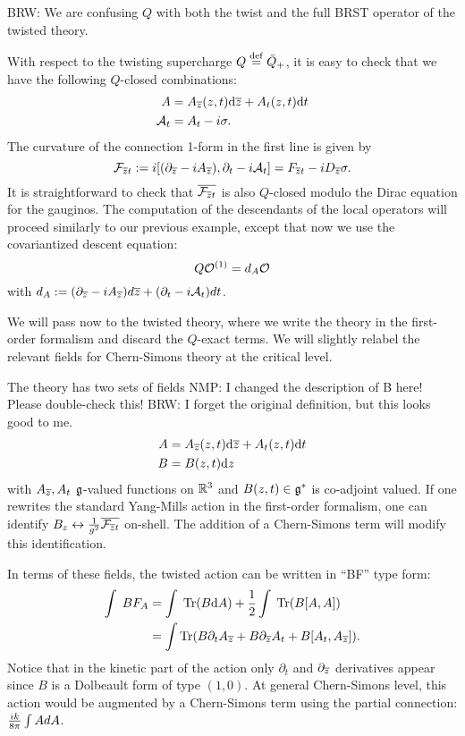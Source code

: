 \documentclass[11pt]{amsart}
\def\brian#1{{\textcolor{blue!65!red}{BRW: {#1}}}}
\def\natalie#1{{\textcolor{green!65!black}{NMP: {#1}}}}
\begin{document}
\brian{We are confusing $Q$ with both the twist and the full BRST operator of the twisted theory.}

With respect to the twisting supercharge $Q \overset{\rm def}{=} \bar{Q}_+$, it is easy to check that we have the following $Q$-closed combinations:
\begin{align}
A & = A_{{\overline{z}}} (z,t) {\rm d} {\overline{z}} + A_{t} (z, t) {\rm d} t \\
\mathcal A_t &= A_t - i \sigma.
\end{align}
The curvature of the connection 1-form in the first line is given by
\[
\mathcal F_{{\overline{z}} t} := i  [(\partial_{{\overline{z}}} - i A_{{\overline{z}}}), \partial_t - i \mathcal A_t] = F_{{\overline{z}} t} - i D_{{\overline{z}}}\sigma.
\] It is straightforward to check that $\overline{\mathcal F_{{\overline{z}} t}}$ is also $Q$-closed modulo the Dirac equation for the gauginos. 
The computation of the descendants of the local operators will proceed similarly to our previous example, except that now we use the covariantized descent equation:
\[
Q \mathcal O^{(1)} = d_{A} \mathcal O
\] with $d_A := (\partial_{{\overline{z}}} - i A_{{\overline{z}}})d{\overline{z}} + (\partial_t - i \mathcal A_t)dt$. 

We will pass now to the twisted theory, where we write the theory in the first-order formalism and discard the $Q$-exact terms. We will slightly relabel the relevant fields for Chern-Simons theory at the critical level. 

The theory has two sets of fields \natalie{I changed the description of B here! Please double-check this!}
\brian{I forget the original definition, but this looks good to me.}
\begin{align*}
A & = A_{{\overline{z}}} (z,t) {\rm d} {\overline{z}} + A_{t} (z, t) {\rm d} t \\
B & = B (z,t) {\rm d} z 
\end{align*}
with $A_{{\overline{z}}}, A_t$ $\mathfrak g$-valued functions on $\mathbb R^3$ and $B(z,t) \in \mathfrak g^*$ is co-adjoint valued. If one rewrites the standard Yang-Mills action in the first-order formalism, one can identify $B_z \leftrightarrow {1 \over g^2} \overline{\mathcal F_{{\overline{z}} t}}$ on-shell. The addition of a Chern-Simons term will modify this identification. 


In terms of these fields, the twisted action can be written in ``BF'' type form:
\begin{align*}
\int \; B F_A & = \int \; \operatorname{Tr}(B {\rm d} A) +  \frac12 \int \; \operatorname{Tr}(B [A,A]) \\
& = \int \operatorname{Tr}(B \partial_t A_{{\overline{z}}} + B \partial_{{\overline{z}}} A_t + B [A_t, A_{\overline{z}}]) .
\end{align*}
Notice that in the kinetic part of the action only $\partial_t$ and $\partial_{{\overline{z}}}$ derivatives appear since $B$ is a Dolbeault form of type $(1,0)$. At general Chern-Simons level, this action would be augmented by a Chern-Simons term using the partial connection: ${i k \over 8 \pi} \int A d A$.
\end{document}

